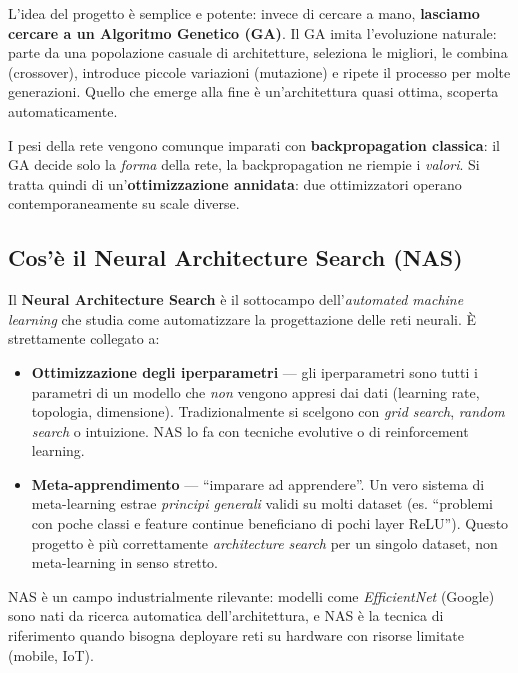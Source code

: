 \documentclass[11pt,a4paper]{article}
\begin{document}
L'idea del progetto è semplice e potente: invece di cercare a mano,
\textbf{lasciamo cercare a un Algoritmo Genetico (GA)}. Il GA imita
l'evoluzione naturale: parte da una popolazione casuale di architetture,
seleziona le migliori, le combina (crossover), introduce piccole variazioni
(mutazione) e ripete il processo per molte generazioni. Quello che emerge
alla fine è un'architettura quasi ottima, scoperta automaticamente.

I pesi della rete vengono comunque imparati con \textbf{backpropagation
classica}: il GA decide solo la \emph{forma} della rete, la backpropagation
ne riempie i \emph{valori}. Si tratta quindi di un'\textbf{ottimizzazione
annidata}: due ottimizzatori operano contemporaneamente su scale diverse.

\subsection{Cos'è il Neural Architecture Search (NAS)}

Il \textbf{Neural Architecture Search} è il sottocampo dell'\emph{automated
machine learning} che studia come automatizzare la progettazione delle reti
neurali. È strettamente collegato a:
\begin{itemize}
    \item \textbf{Ottimizzazione degli iperparametri} — gli iperparametri
          sono tutti i parametri di un modello che \emph{non} vengono
          appresi dai dati (learning rate, topologia, dimensione).
          Tradizionalmente si scelgono con \emph{grid search}, \emph{random
          search} o intuizione. NAS lo fa con tecniche evolutive o di
          reinforcement learning.
    \item \textbf{Meta-apprendimento} — ``imparare ad apprendere''. Un vero
          sistema di meta-learning estrae \emph{principi generali} validi
          su molti dataset (es. ``problemi con poche classi e feature
          continue beneficiano di pochi layer ReLU''). Questo progetto è
          più correttamente \emph{architecture search} per un singolo
          dataset, non meta-learning in senso stretto.
\end{itemize}

NAS è un campo industrialmente rilevante: modelli come \emph{EfficientNet}
(Google) sono nati da ricerca automatica dell'architettura, e NAS è la
tecnica di riferimento quando bisogna deployare reti su hardware con
risorse limitate (mobile, IoT).
\end{document}
